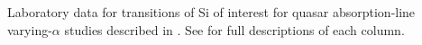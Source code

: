 Laboratory data for transitions of Si of interest for quasar absorption-line varying-$\alpha$ studies described in . See  for full descriptions of each column.
